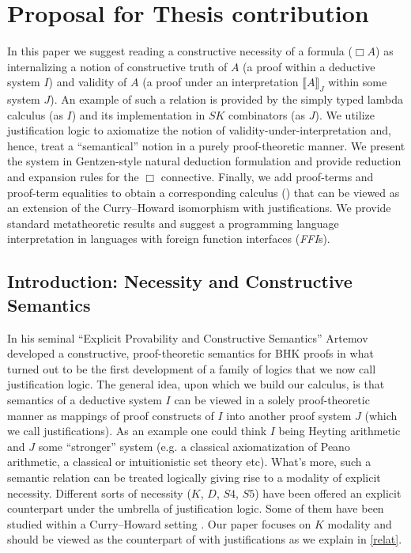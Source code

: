 \chapter{Proposal for Thesis contribution}\label{proposal}
In this paper we suggest reading a constructive necessity  of a formula ($\Box A$) as  internalizing a notion of constructive truth of $A$ 
(a proof within a deductive system $I$) and validity of $A$
(a proof under an interpretation  $\llbracket A \rrbracket_J$ within some system $J$).  An example of such a relation is provided by the simply typed lambda calculus
(as $I$) and its implementation in $SK$ combinators (as $J$). We utilize justification logic to axiomatize the notion of 
validity-under-interpretation and, hence, treat  a  ``semantical'' notion in a purely proof-theoretic manner. We present the system  in 
Gentzen-style  natural deduction formulation  and provide reduction and expansion rules for the $\Box$ connective. Finally, we add proof-terms and proof-term equalities
to obtain a corresponding calculus ({}) that can be viewed as an extension of the Curry--Howard isomorphism with justifications.
We provide standard metatheoretic results  and suggest a 
programming language  interpretation in  languages with foreign function interfaces (\textit{FFI}s).

\section{Introduction: Necessity and Constructive Semantics}
In his seminal ``Explicit Provability and Constructive Semantics'' \cite{Artemov2001} Artemov developed a constructive, proof-theoretic semantics for 
\acs{BHK} proofs \cite{troelstra1988constructivism} 
in what turned out to be the first development of a family of logics that we now call justification logic.
The general idea, upon which we build our calculus, is that semantics of a deductive system $I$ can be viewed in a solely proof-theoretic manner 
as mappings of proof constructs of $I$ into another proof system $J$ (which we call justifications).
As an example one could think  $I$  being  Heyting arithmetic and $J$ some  ``stronger'' system 
(e.g. a classical axiomatization of Peano arithmetic, a classical or intuitionistic set theory etc). %
What's more,  such a semantic relation can be treated logically giving  rise to a modality of explicit necessity. Different sorts of necessity
($K$, $D$, $S4$, $S5$) have been offered  an explicit counterpart under the umbrella of justification logic. Some of them have been studied within a
Curry--Howard setting \cite{ArtBon07LFCS}. Our paper
focuses on  $K$ modality and  should be viewed as the  counterpart of \cite{Bellin2001} with justifications as we explain in \ref{relat}.
